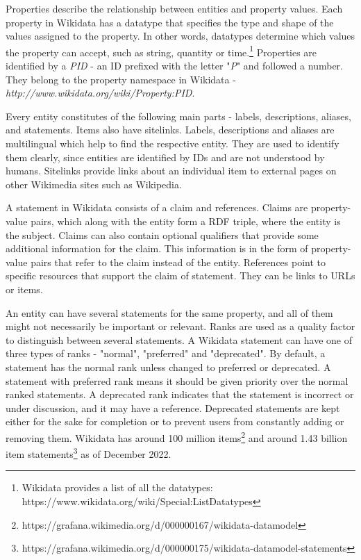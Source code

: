 Properties describe the relationship between entities and property values. Each property in Wikidata has a datatype that specifies the type and shape of the values assigned to the property. In other words, datatypes determine which values the property can accept, such as string, quantity or time.\footnote{Wikidata provides a list of all the datatypes: https://www.wikidata.org/wiki/Special:ListDatatypes} Properties are identified by a \textit{PID} - an ID prefixed with the letter "\textit{P}" and followed a number. They belong to the property namespace in Wikidata - \textit{http://www.wikidata.org/wiki/Property:PID}. 

Every entity constitutes of the following main parts - labels, descriptions, aliases, and statements. Items also have sitelinks. Labels, descriptions and aliases are multilingual which help to find the respective entity. They are used to identify them clearly, since entities are identified by IDs and are not understood by humans. Sitelinks provide links about an individual item to external pages on other Wikimedia sites such as Wikipedia. 

A statement in Wikidata consists of a claim and references. Claims are property-value pairs, which along with the entity form a RDF triple, where the entity is the subject. Claims can also contain optional qualifiers that provide some additional information for the claim. This information is in the form of property-value pairs that refer to the claim instead of the entity. References point to specific resources that support the claim of statement. They can be links to URLs or items.

An entity can have several statements for the same property, and all of them might not necessarily be important or relevant. Ranks are used as a quality factor to distinguish between several statements. A Wikidata statement can have one of three types of ranks - "normal", "preferred" and "deprecated". By default, a statement has the normal rank unless changed to preferred or deprecated. A statement with preferred rank means it should be given priority over the normal ranked statements. A deprecated rank indicates that the statement is incorrect or under discussion, and it may have a reference. Deprecated statements are kept either for the sake for completion or to prevent users from constantly adding or removing them. Wikidata has around 100 million items\footnote{https://grafana.wikimedia.org/d/000000167/wikidata-datamodel} and around 1.43 billion item statements\footnote{https://grafana.wikimedia.org/d/000000175/wikidata-datamodel-statements} as of December 2022. 

